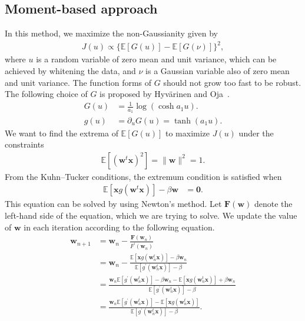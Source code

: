 \documentclass[aps,prl,preprint,superscriptaddress]{revtex4-2}
\begin{document}
\subsection{Moment-based approach}
In this method, we maximize the non-Gaussianity given by
\begin{align}
J(u) \propto \{\mathbb{E}[G(u)] - \mathbb{E}[G(\nu)]\}^2,
\end{align}
where $u$ is a random variable of zero mean and unit variance, which can be achieved by whitening the data, and $\nu$ is a Gaussian variable also of zero mean and unit variance. The function forms of $G$ should not grow too fast to be robust. The following choice of $G$ is proposed by Hyvärinen and Oja~\cite{hyvarinen2000independent}.
\begin{align}
G(u) &= \frac{1}{a_1} \log (\cosh a_1 u). \\
g(u) &= \partial_u G(u) = \tanh(a_1 u).
\end{align}
We want to find the extrema of $\mathbb{E}[G(u)]$ to maximize $J(u)$ under the constraints
\begin{align}
\mathbb{E}[(\mathbf{w}^{t}\mathbf{x})^2] = \| \mathbf{w}\|^2 = 1.
\end{align}
From the Kuhn--Tucker conditions, the extremum condition is satisfied when
\begin{align}
\mathbb{E}[\mathbf{x}g(\mathbf{w}^{t}\mathbf{x})] - \beta\mathbf{w} &= \mathbf{0}.
\end{align}
This equation can be solved by using Newton's method.
Let $\mathbf{F}(\mathbf{w})$ denote the left-hand side of the equation, which we are trying to solve.
We update the value of $\mathbf{w}$ in each iteration according to the following equation.
\begin{align}
\mathbf{w}_{n+1} &= \mathbf{w}_n - \frac{\mathbf{F}(\mathbf{w}_n)}{F^{\prime}(\mathbf{w}_n)} \\
&= \mathbf{w}_n - \frac{\mathbb{E}[\mathbf{x}g(\mathbf{w}_n^t\mathbf{x})] - \beta \mathbf{w}_n}{\mathbb{E}[g^{\prime}(\mathbf{w}_n^t\mathbf{x})] - \beta} \\
&= \frac{\mathbf{w}_n\mathbb{E}[g^{\prime}(\mathbf{w}_n^t\mathbf{x})] - \beta\mathbf{w}_n - \mathbb{E}[\mathbf{x}g(\mathbf{w}_n^t\mathbf{x})] + \beta\mathbf{w}_n}{\mathbb{E}[g^{\prime}(\mathbf{w}_n^t\mathbf{x})] - \beta} \\
&= \frac{\mathbf{w}_n\mathbb{E}[g^{\prime}(\mathbf{w}_n^t\mathbf{x})] - \mathbb{E}[\mathbf{x}g(\mathbf{w}_n^t\mathbf{x})]}{\mathbb{E}[g^{\prime}(\mathbf{w}_n^t\mathbf{x})] - \beta}.
\end{align}
\end{document}
